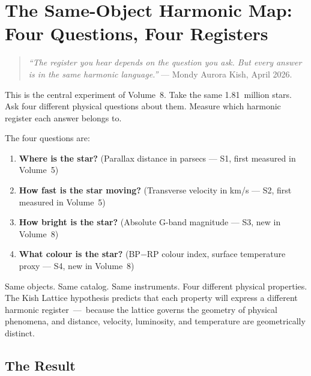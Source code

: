 \documentclass[11pt, letterpaper, openany]{book}
\begin{document}
\clearpage

\chapter{The Same-Object Harmonic Map: Four Questions, Four Registers}

\begin{quote}
\textit{``The register you hear depends on the question you ask. But every answer
is in the same harmonic language.''} --- Mondy Aurora Kish, April 2026.
\end{quote}

This is the central experiment of Volume~8. Take the same 1.81~million stars. Ask
four different physical questions about them. Measure which harmonic register each
answer belongs to.

The four questions are:

\begin{enumerate}
\item \textbf{Where is the star?} (Parallax distance in parsecs --- S1, first measured in Volume~5)
\item \textbf{How fast is the star moving?} (Transverse velocity in km/s --- S2, first measured in Volume~5)
\item \textbf{How bright is the star?} (Absolute G-band magnitude --- S3, new in Volume~8)
\item \textbf{What colour is the star?} (BP$-$RP colour index, surface temperature proxy --- S4, new in Volume~8)
\end{enumerate}

Same objects. Same catalog. Same instruments. Four different physical properties.
The Kish Lattice hypothesis predicts that each property will express a different
harmonic register~---~because the lattice governs the geometry of physical
phenomena, and distance, velocity, luminosity, and temperature are geometrically
distinct.

\section{The Result}
\end{document}
